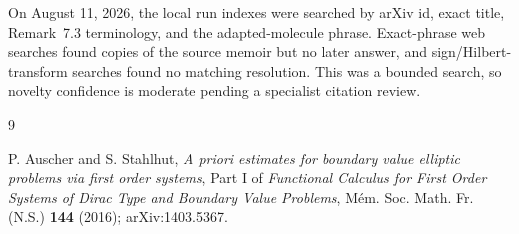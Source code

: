 \documentclass[11pt]{article}
\begin{document}
On August 11, 2026, the local run indexes were searched by arXiv id, exact
title, Remark~7.3 terminology, and the adapted-molecule phrase.  Exact-phrase
web searches found copies of the source memoir but no later answer, and
sign/Hilbert-transform searches found no matching resolution.  This was a
bounded search, so novelty confidence is moderate pending a specialist
citation review.

\begin{thebibliography}{9}

P. Auscher and S. Stahlhut,
\emph{A priori estimates for boundary value elliptic problems via first order
systems},
Part I of \emph{Functional Calculus for First Order Systems of Dirac Type and
Boundary Value Problems}, M\'em. Soc. Math. Fr. (N.S.) \textbf{144} (2016);
arXiv:1403.5367.

\end{thebibliography}
\end{document}
